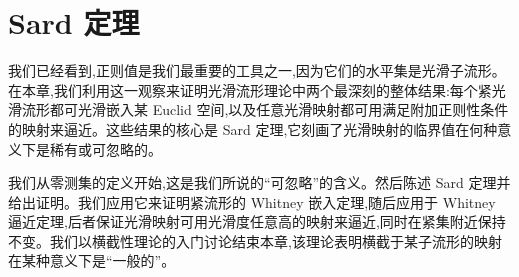 \documentclass[../main.tex]{subfiles}
\begin{document}
\chapter{Sard 定理}\label{chapter:ch06-Sard定理}

我们已经看到,正则值是我们最重要的工具之一,因为它们的水平集是光滑子流形。在本章,我们利用这一观察来证明光滑流形理论中两个最深刻的整体结果:每个紧光滑流形都可光滑嵌入某 Euclid 空间,以及任意光滑映射都可用满足附加正则性条件的映射来逼近。这些结果的核心是 Sard 定理,它刻画了光滑映射的临界值在何种意义下是稀有或可忽略的。

我们从零测集的定义开始,这是我们所说的``可忽略''的含义。然后陈述 Sard 定理并给出证明。我们应用它来证明紧流形的 Whitney 嵌入定理,随后应用于 Whitney 逼近定理,后者保证光滑映射可用光滑度任意高的映射来逼近,同时在紧集附近保持不变。我们以横截性理论的入门讨论结束本章,该理论表明横截于某子流形的映射在某种意义下是``一般的''。







\end{document}
